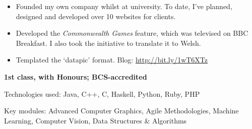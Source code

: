 \documentclass[10pt,a4paper,ragged2e,withhyper]{altacv}
\begin{document}
\begin{paracol}{2}
\begin{itemize}
    \item Founded my own company whilst at university. To date, I've planned, designed and developed over 10 websites for clients.
\end{itemize}

\divider


\begin{itemize}
    \item Developed the \emph{Commonwealth Games} feature, which was televised on BBC Breakfast. I also took the initiative to translate it to Welsh.
    \item Templated the ‘datapic’ format. Blog: \url{http://bit.ly/1wT6XTz}
\end{itemize}



\textbf{1st class, with Honours; BCS-accredited}

Technologies used: Java, C++, C, Haskell, Python, Ruby, PHP

Key modules: Advanced Computer Graphics, Agile Methodologies, Machine Learning, Computer Vision, Data Structures \& Algorithms

\divider



\nocite{*}

\printbibliography[heading=pubtype,title={\printinfo{\faBook}{Newsletters}},type=newsletter]

\printbibliography[heading=pubtype,title={\printinfo{\faUsers}{Talks}},type=inproceedings]


\printbibliography[heading=pubtype,title={\printinfo{\faBook}{Books}},type=book]


\printbibliography[heading=pubtype,title={\printinfo{\faFile*[regular]}{Articles}}, type=misc]


\switchcolumn


\end{paracol}
\end{document}
